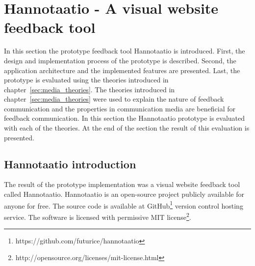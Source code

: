 \documentclass[english,12pt,a4paper,pdftex]{article}
\begin{document}
\clearpage

\section{Hannotaatio - A visual website feedback tool}
\label{sec:hannotaatio}
\acresetall

In this section the prototype feedback tool Hannotaatio is introduced. First, the design and implementation process of the prototype is described. Second, the application architecture and the implemented features are presented. Last, the prototype is evaluated using the theories introduced in chapter~\ref{sec:media_theories}. The theories introduced in chapter~\ref{sec:media_theories} were used to explain the nature of feedback communication and the properties in communication media are beneficial for feedback communication. In this section the Hannotaatio prototype is evaluated with each of the theories. At the end of the section the result of this evaluation is presented.

\subsection{Hannotaatio introduction}

The result of the prototype implementation was a visual website feedback tool called Hannotaatio. Hannotaatio is an open-source project publicly available for anyone for free. The source code is available at GitHub\footnote{https://github.com/futurice/hannotaatio} version control hosting service. The software is licensed with permissive MIT license\footnote{http://opensource.org/licenses/mit-license.html}.
\end{document}
